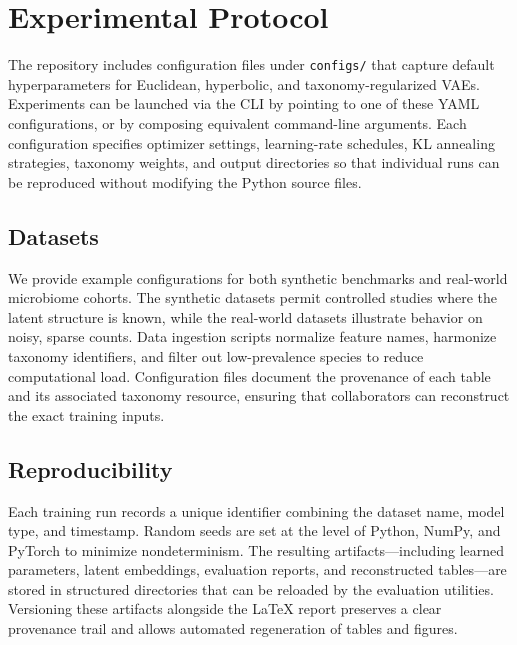 \documentclass[11pt]{article}
\begin{document}
\section{Experimental Protocol}
The repository includes configuration files under \texttt{configs/} that capture
default hyperparameters for Euclidean, hyperbolic, and taxonomy-regularized VAEs.
Experiments can be launched via the CLI by pointing to one of these YAML
configurations, or by composing equivalent command-line arguments. Each
configuration specifies optimizer settings, learning-rate schedules, KL annealing
strategies, taxonomy weights, and output directories so that individual runs can
be reproduced without modifying the Python source files.

\subsection{Datasets}
We provide example configurations for both synthetic benchmarks and real-world
microbiome cohorts. The synthetic datasets permit controlled studies where the
latent structure is known, while the real-world datasets illustrate behavior on
noisy, sparse counts. Data ingestion scripts normalize feature names, harmonize
taxonomy identifiers, and filter out low-prevalence species to reduce
computational load. Configuration files document the provenance of each table and
its associated taxonomy resource, ensuring that collaborators can reconstruct the
exact training inputs.

\subsection{Reproducibility}
Each training run records a unique identifier combining the dataset name, model
type, and timestamp. Random seeds are set at the level of Python, NumPy, and
PyTorch to minimize nondeterminism. The resulting artifacts---including learned
parameters, latent embeddings, evaluation reports, and reconstructed tables---are
stored in structured directories that can be reloaded by the evaluation
utilities. Versioning these artifacts alongside the LaTeX report preserves a
clear provenance trail and allows automated regeneration of tables and figures.
\end{document}
